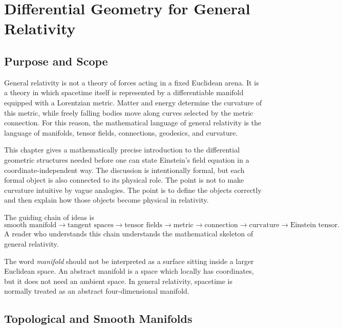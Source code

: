 \chapter{Differential Geometry for General Relativity}

\section{Purpose and Scope}

General relativity is not a theory of forces acting in a fixed Euclidean arena.
It is a theory in which spacetime itself is represented by a differentiable
manifold equipped with a Lorentzian metric. Matter and energy determine the
curvature of this metric, while freely falling bodies move along curves selected
by the metric connection. For this reason, the mathematical language of general
relativity is the language of manifolds, tensor fields, connections, geodesics,
and curvature.

This chapter gives a mathematically precise introduction to the differential
geometric structures needed before one can state Einstein's field equation in a
coordinate-independent way. The discussion is intentionally formal, but each
formal object is also connected to its physical role. The point is not to make
curvature intuitive by vague analogies. The point is to define the objects
correctly and then explain how those objects become physical in relativity.

The guiding chain of ideas is
\[
\text{smooth manifold}
\longrightarrow
\text{tangent spaces}
\longrightarrow
\text{tensor fields}
\longrightarrow
\text{metric}
\longrightarrow
\text{connection}
\longrightarrow
\text{curvature}
\longrightarrow
\text{Einstein tensor}.
\]
A reader who understands this chain understands the mathematical skeleton of
general relativity.

\begin{remarkbox}
The word \emph{manifold} should not be interpreted as a surface sitting inside a
larger Euclidean space. An abstract manifold is a space which locally has
coordinates, but it does not need an ambient space. In general relativity,
spacetime is normally treated as an abstract four-dimensional manifold.
\end{remarkbox}

\clearpage

\section{Topological and Smooth Manifolds}

